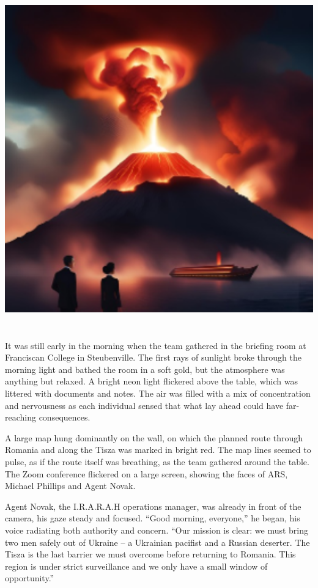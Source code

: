 \documentclass[
]{article}
\begin{document}
\includegraphics[width=6in,height=5.78125in]{media/image6.png}

It was still early in the morning when the team gathered in the briefing
room at Franciscan College in Steubenville. The first rays of sunlight
broke through the morning light and bathed the room in a soft gold, but
the atmosphere was anything but relaxed. A bright neon light flickered
above the table, which was littered with documents and notes. The air
was filled with a mix of concentration and nervousness as each
individual sensed that what lay ahead could have far-reaching
consequences.

A large map hung dominantly on the wall, on which the planned route
through Romania and along the Tisza was marked in bright red. The map
lines seemed to pulse, as if the route itself was breathing, as the team
gathered around the table. The Zoom conference flickered on a large
screen, showing the faces of ARS, Michael Phillips and Agent Novak.

Agent Novak, the I.R.A.R.A.H operations manager, was already in front of
the camera, his gaze steady and focused. ``Good morning, everyone,'' he
began, his voice radiating both authority and concern. ``Our mission is
clear: we must bring two men safely out of Ukraine -- a Ukrainian
pacifist and a Russian deserter. The Tisza is the last barrier we must
overcome before returning to Romania. This region is under strict
surveillance and we only have a small window of opportunity.''
\end{document}
